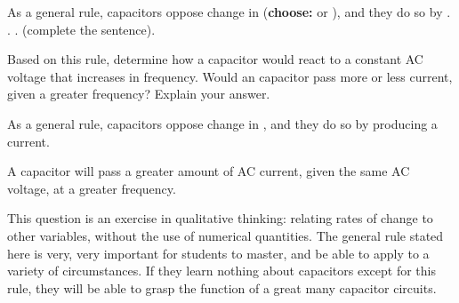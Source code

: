 

As a general rule, capacitors oppose change in ({\bf choose:}  or ), and they do so by . . . (complete the sentence).

\vskip 10pt

Based on this rule, determine how a capacitor would react to a constant AC voltage that increases in frequency.  Would an capacitor pass more or less current, given a greater frequency?  Explain your answer.







As a general rule, capacitors oppose change in , and they do so by producing a current.

\vskip 10pt

A capacitor will pass a greater amount of AC current, given the same AC voltage, at a greater frequency.







This question is an exercise in qualitative thinking: relating rates of change to other variables, without the use of numerical quantities.  The general rule stated here is very, very important for students to master, and be able to apply to a variety of circumstances.  If they learn nothing about capacitors except for this rule, they will be able to grasp the function of a great many capacitor circuits.



